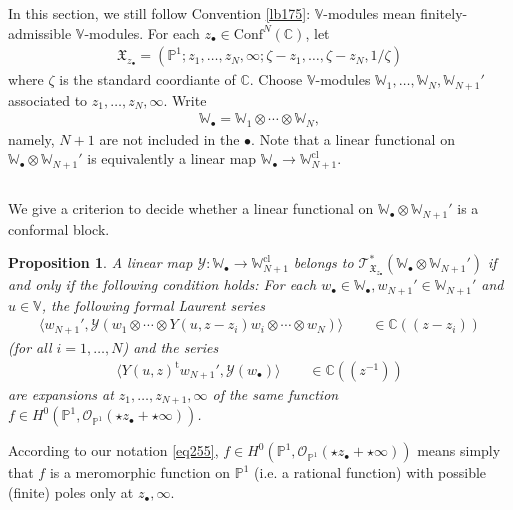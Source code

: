 \documentclass[11pt,b5paper,notitlepage]{article}
\theoremstyle{definition}
\theoremstyle{plain}
\newtheorem{pp}[df]{Proposition}
\newcommand{\fk}{\mathfrak}
\newcommand{\mc}{\mathcal}
\newcommand{\tr}{\mathrm{t}} %
\newcommand{\Conf}{\mathrm{Conf}}
\newcommand{\bigbk}[1]{\big\langle {#1}\big\rangle}
\newcommand{\scr}{\mathscr}
\newcommand{\blt}{\bullet}
\newcommand{\Vbb}{\mathbb V}
\newcommand{\Wbb}{\mathbb W}
\newcommand{\Cbb}{\mathbb C}
\newcommand{\Pbb}{\mathbb P}
\newcommand{\cl}{\mathrm{cl}}
\numberwithin{equation}{section}
\begin{document}
In this section, we still follow Convention \ref{lb175}: $\Vbb$-modules mean finitely-admissible $\Vbb$-modules. For each $z_\blt\in\Conf^N(\Cbb)$, let
\begin{align*}
\fk X_{z_\blt}=(\Pbb^1;z_1,\dots,z_N,\infty;\zeta-z_1,\dots,\zeta-z_N,1/\zeta)
\end{align*}
where $\zeta$ is the standard coordiante of $\Cbb$. Choose $\Vbb$-modules $\Wbb_1,\dots,\Wbb_N,\Wbb_{N+1}'$ associated to $z_1,\dots,z_N,\infty$. Write
\begin{align*}
\Wbb_\blt=\Wbb_1\otimes\cdots\otimes\Wbb_N,
\end{align*}
namely, $N+1$ are not included in the $\blt$. Note that a linear functional on $\Wbb_\blt\otimes\Wbb_{N+1}'$ is equivalently a linear map $\Wbb_\blt\rightarrow\Wbb_{N+1}^\cl$.





\subsection{}

We give a criterion to decide whether a linear functional on $\Wbb_\blt\otimes\Wbb_{N+1}'$ is a conformal block.

\begin{pp}\label{lb176}
A linear map $\mc Y:\Wbb_\blt\rightarrow\Wbb_{N+1}^\cl$ belongs to $\scr T_{\fk X_{z_\blt}}^*(\Wbb_\blt\otimes\Wbb_{N+1}')$ if and only if the following condition holds: For each $w_\blt\in\Wbb_\blt,w_{N+1}'\in\Wbb_{N+1}'$ and $u\in\Vbb$, the following formal Laurent series
\begin{gather*}
\bigbk{w_{N+1}',\mc Y(w_1\otimes\cdots\otimes Y(u,z-z_i)w_i\otimes\cdots\otimes w_N)}\qquad \in\Cbb((z-z_i))
\end{gather*}
(for all $i=1,\dots,N$) and the series
\begin{align*}
\bigbk{Y(u,z)^\tr w_{N+1}',\mc Y(w_\blt)}\qquad\in\Cbb((z^{-1}))
\end{align*}
are expansions at $z_1,\dots,z_{N+1},\infty$ of the same function $f\in H^0(\Pbb^1,\scr O_{\Pbb^1}(\star z_\blt+\star\infty))$.
\end{pp}

According to our notation \eqref{eq255}, $f\in H^0(\Pbb^1,\scr O_{\Pbb^1}(\star z_\blt+\star\infty))$ means simply that $f$ is a meromorphic  function on $\Pbb^1$ (i.e. a rational function) with possible (finite) poles only at $z_\blt,\infty$.
\end{document}
